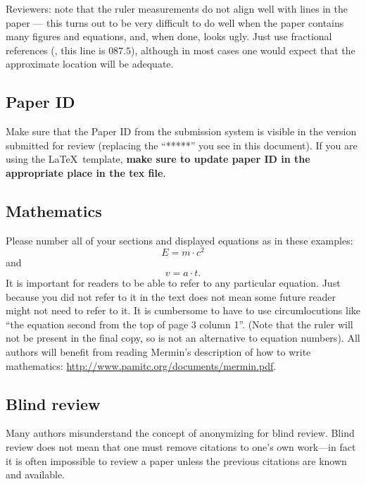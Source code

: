 \documentclass[10pt,twocolumn,letterpaper]{article}
\begin{document}
Reviewers:
note that the ruler measurements do not align well with lines in the paper --- this turns out to be very difficult to do well when the paper contains many figures and equations, and, when done, looks ugly.
Just use fractional references (\eg, this line is $087.5$), although in most cases one would expect that the approximate location will be adequate.


\subsection{Paper ID}
Make sure that the Paper ID from the submission system is visible in the version submitted for review (replacing the ``*****'' you see in this document).
If you are using the \LaTeX\ template, \textbf{make sure to update paper ID in the appropriate place in the tex file}.


\subsection{Mathematics}

Please number all of your sections and displayed equations as in these examples:
\begin{equation}
  E = m\cdot c^2
  \label{eq:important}
\end{equation}
and
\begin{equation}
  v = a\cdot t.
  \label{eq:also-important}
\end{equation}
It is important for readers to be able to refer to any particular equation.
Just because you did not refer to it in the text does not mean some future reader might not need to refer to it.
It is cumbersome to have to use circumlocutions like ``the equation second from the top of page 3 column 1''.
(Note that the ruler will not be present in the final copy, so is not an alternative to equation numbers).
All authors will benefit from reading Mermin's description of how to write mathematics:
\url{http://www.pamitc.org/documents/mermin.pdf}.

\subsection{Blind review}

Many authors misunderstand the concept of anonymizing for blind review.
Blind review does not mean that one must remove citations to one's own work---in fact it is often impossible to review a paper unless the previous citations are known and available.
\end{document}
